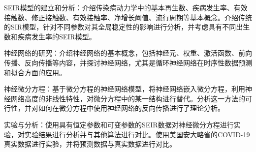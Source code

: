 SEIR模型的建立和分析：介绍传染病动力学中的基本再生数、疾病发生率、有效接触数、修正接触数、有效接触率、净增长阈值、流行周期等基本概念。介绍传统的SIR模型，针对不同参数对其全局稳定性的影响进行分析，并考虑具有不同出生数和疾病发生率的SEIR模型。

神经网络的研究：介绍神经网络的基本概念，包括神经元、权重、激活函数、前向传播、反向传播等内容，并探讨神经网络，尤其是循环神经网络在时序性数据预测和拟合方面的应用。

神经微分方程：基于微分方程的神经网络模型，将神经网络嵌入微分方程，利用神经网络高度的非线性特性，对微分方程中的某一结构进行替代。分析这一方法的可行性，并对如何在微分方程中使用神经网络的反向传播进行了理论分析。

实验与分析：使用具有恒定参数和可变参数的SEIR数据对神经微分方程进行实验，对实验结果进行分析并与其他算法进行对比。使用美国安大略省的COVID-19真实数据进行实验，并将预测数据与真实数据进行对比。